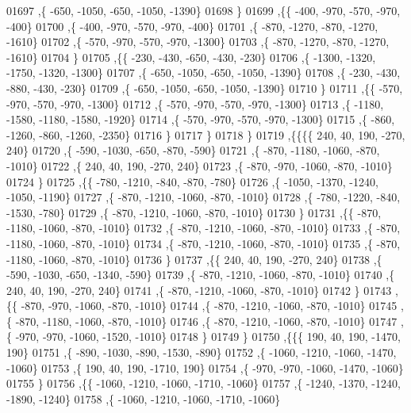 \begin{DoxyCode}
01697     ,\{  -650, -1050,  -650, -1050, -1390\}
01698     \}
01699    ,\{\{  -400,  -970,  -570,  -970,  -400\}
01700     ,\{  -400,  -970,  -570,  -970,  -400\}
01701     ,\{  -870, -1270,  -870, -1270, -1610\}
01702     ,\{  -570,  -970,  -570,  -970, -1300\}
01703     ,\{  -870, -1270,  -870, -1270, -1610\}
01704     \}
01705    ,\{\{  -230,  -430,  -650,  -430,  -230\}
01706     ,\{ -1300, -1320, -1750, -1320, -1300\}
01707     ,\{  -650, -1050,  -650, -1050, -1390\}
01708     ,\{  -230,  -430,  -880,  -430,  -230\}
01709     ,\{  -650, -1050,  -650, -1050, -1390\}
01710     \}
01711    ,\{\{  -570,  -970,  -570,  -970, -1300\}
01712     ,\{  -570,  -970,  -570,  -970, -1300\}
01713     ,\{ -1180, -1580, -1180, -1580, -1920\}
01714     ,\{  -570,  -970,  -570,  -970, -1300\}
01715     ,\{  -860, -1260,  -860, -1260, -2350\}
01716     \}
01717    \}
01718   \}
01719  ,\{\{\{\{   240,    40,   190,  -270,   240\}
01720     ,\{  -590, -1030,  -650,  -870,  -590\}
01721     ,\{  -870, -1180, -1060,  -870, -1010\}
01722     ,\{   240,    40,   190,  -270,   240\}
01723     ,\{  -870,  -970, -1060,  -870, -1010\}
01724     \}
01725    ,\{\{  -780, -1210,  -840,  -870,  -780\}
01726     ,\{ -1050, -1370, -1240, -1050, -1190\}
01727     ,\{  -870, -1210, -1060,  -870, -1010\}
01728     ,\{  -780, -1220,  -840, -1530,  -780\}
01729     ,\{  -870, -1210, -1060,  -870, -1010\}
01730     \}
01731    ,\{\{  -870, -1180, -1060,  -870, -1010\}
01732     ,\{  -870, -1210, -1060,  -870, -1010\}
01733     ,\{  -870, -1180, -1060,  -870, -1010\}
01734     ,\{  -870, -1210, -1060,  -870, -1010\}
01735     ,\{  -870, -1180, -1060,  -870, -1010\}
01736     \}
01737    ,\{\{   240,    40,   190,  -270,   240\}
01738     ,\{  -590, -1030,  -650, -1340,  -590\}
01739     ,\{  -870, -1210, -1060,  -870, -1010\}
01740     ,\{   240,    40,   190,  -270,   240\}
01741     ,\{  -870, -1210, -1060,  -870, -1010\}
01742     \}
01743    ,\{\{  -870,  -970, -1060,  -870, -1010\}
01744     ,\{  -870, -1210, -1060,  -870, -1010\}
01745     ,\{  -870, -1180, -1060,  -870, -1010\}
01746     ,\{  -870, -1210, -1060,  -870, -1010\}
01747     ,\{  -970,  -970, -1060, -1520, -1010\}
01748     \}
01749    \}
01750   ,\{\{\{   190,    40,   190, -1470,   190\}
01751     ,\{  -890, -1030,  -890, -1530,  -890\}
01752     ,\{ -1060, -1210, -1060, -1470, -1060\}
01753     ,\{   190,    40,   190, -1710,   190\}
01754     ,\{  -970,  -970, -1060, -1470, -1060\}
01755     \}
01756    ,\{\{ -1060, -1210, -1060, -1710, -1060\}
01757     ,\{ -1240, -1370, -1240, -1890, -1240\}
01758     ,\{ -1060, -1210, -1060, -1710, -1060\}

\end{DoxyCode}
